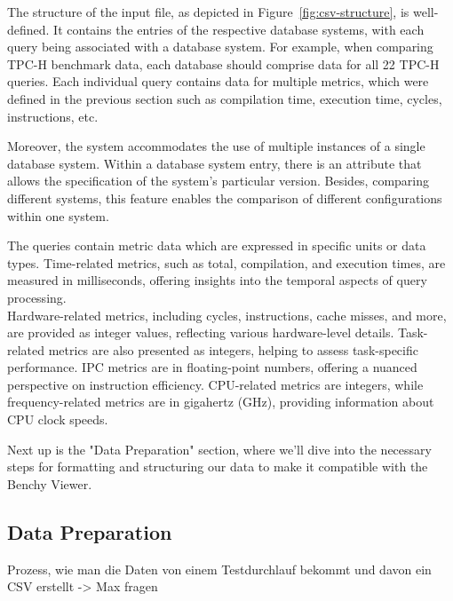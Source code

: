 The structure of the input file, as depicted in Figure~\ref{fig:csv-structure}, is well-defined. It contains the entries of the respective database systems, with each query being associated with a database system. For example, when comparing TPC-H benchmark data, each database should comprise data for all 22 TPC-H queries. Each individual query contains data for multiple metrics, which were defined in the previous section such as compilation time, execution time, cycles, instructions, etc.

Moreover, the system accommodates the use of multiple instances of a single database system. Within a database system entry, there is an attribute that allows the specification of the system's particular version. Besides, comparing different systems, this feature enables the comparison of different configurations within one system.

The queries contain metric data  which are expressed in specific units or data types. Time-related metrics, such as total, compilation, and execution times, are measured in milliseconds, offering insights into the temporal aspects of query processing.\\
Hardware-related metrics, including cycles, instructions, cache misses, and more, are provided as integer values, reflecting various hardware-level details. Task-related metrics are also presented as integers, helping to assess task-specific performance. IPC metrics are in floating-point numbers, offering a nuanced perspective on instruction efficiency. CPU-related metrics are integers, while frequency-related metrics are in gigahertz (GHz), providing information about CPU clock speeds.

Next up is the "Data Preparation" section, where we'll dive into the necessary steps for formatting and structuring our data to make it compatible with the Benchy Viewer.

\subsection{Data Preparation}
Prozess, wie man die Daten von einem Testdurchlauf bekommt und davon ein CSV erstellt
-> Max fragen

